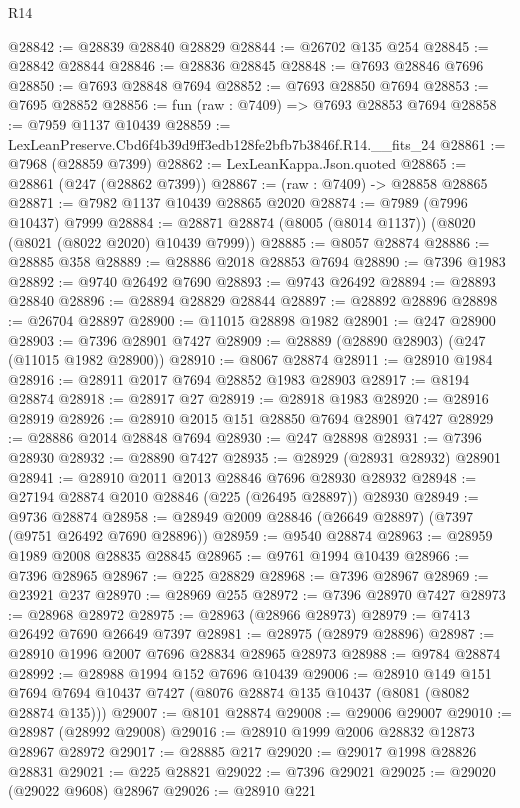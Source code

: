 \begin{lexlean}{R14}
\begin{coremodule}
@28842 := @28839 @28840 @28829
@28844 := @26702 @135 @254
@28845 := @28842 @28844
@28846 := @28836 @28845
@28848 := @7693 @28846 @7696
@28850 := @7693 @28848 @7694
@28852 := @7693 @28850 @7694
@28853 := @7695 @28852
@28856 := fun (raw : @7409) => @7693 @28853 @7694
@28858 := @7959 @1137 @10439
@28859 := LexLeanPreserve.Cbd6f4b39d9ff3edb128fe2bfb7b3846f.R14.__fits_24
@28861 := @7968 (@28859 @7399)
@28862 := LexLeanKappa.Json.quoted
@28865 := @28861 (@247 (@28862 @7399))
@28867 := (raw : @7409) -> @28858 @28865
@28871 := @7982 @1137 @10439 @28865 @2020
@28874 := @7989 (@7996 @10437) @7999
@28884 := @28871 @28874 (@8005 (@8014 @1137)) (@8020 (@8021 (@8022 @2020) @10439 @7999))
@28885 := @8057 @28874
@28886 := @28885 @358
@28889 := @28886 @2018 @28853 @7694
@28890 := @7396 @1983
@28892 := @9740 @26492 @7690
@28893 := @9743 @26492
@28894 := @28893 @28840
@28896 := @28894 @28829 @28844
@28897 := @28892 @28896
@28898 := @26704 @28897
@28900 := @11015 @28898 @1982
@28901 := @247 @28900
@28903 := @7396 @28901 @7427
@28909 := @28889 (@28890 @28903) (@247 (@11015 @1982 @28900))
@28910 := @8067 @28874
@28911 := @28910 @1984
@28916 := @28911 @2017 @7694 @28852 @1983 @28903
@28917 := @8194 @28874
@28918 := @28917 @27
@28919 := @28918 @1983
@28920 := @28916 @28919
@28926 := @28910 @2015 @151 @28850 @7694 @28901 @7427
@28929 := @28886 @2014 @28848 @7694
@28930 := @247 @28898
@28931 := @7396 @28930
@28932 := @28890 @7427
@28935 := @28929 (@28931 @28932) @28901
@28941 := @28910 @2011 @2013 @28846 @7696 @28930 @28932
@28948 := @27194 @28874 @2010 @28846 (@225 (@26495 @28897)) @28930
@28949 := @9736 @28874
@28958 := @28949 @2009 @28846 (@26649 @28897) (@7397 (@9751 @26492 @7690 @28896))
@28959 := @9540 @28874
@28963 := @28959 @1989 @2008 @28835 @28845
@28965 := @9761 @1994 @10439
@28966 := @7396 @28965
@28967 := @225 @28829
@28968 := @7396 @28967
@28969 := @23921 @237
@28970 := @28969 @255
@28972 := @7396 @28970 @7427
@28973 := @28968 @28972
@28975 := @28963 (@28966 @28973)
@28979 := @7413 @26492 @7690 @26649 @7397
@28981 := @28975 (@28979 @28896)
@28987 := @28910 @1996 @2007 @7696 @28834 @28965 @28973
@28988 := @9784 @28874
@28992 := @28988 @1994 @152 @7696 @10439
@29006 := @28910
    @149
    @151
    @7694
    @7694
    @10437
    @7427
    (@8076 @28874 @135 @10437 (@8081 (@8082 @28874 @135)))
@29007 := @8101 @28874
@29008 := @29006 @29007
@29010 := @28987 (@28992 @29008)
@29016 := @28910 @1999 @2006 @28832 @12873 @28967 @28972
@29017 := @28885 @217
@29020 := @29017 @1998 @28826 @28831
@29021 := @225 @28821
@29022 := @7396 @29021
@29025 := @29020 (@29022 @9608) @28967
@29026 := @28910 @221

\end{coremodule}
\end{lexlean}

